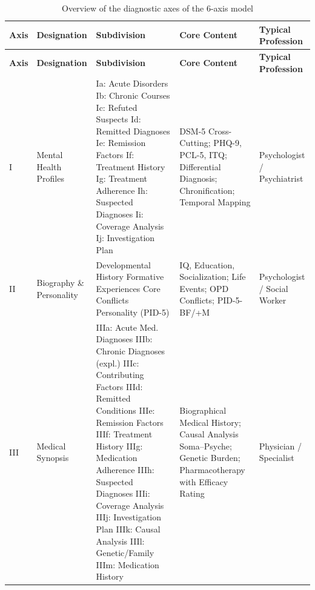 \documentclass[11pt,a4paper]{article}
\begin{document}
\begin{longtable}{p{0.8cm}p{2.2cm}p{3.8cm}p{4cm}p{2cm}}
\caption{Overview of the diagnostic axes of the 6-axis model} \label{tab:achsen} \\
\toprule
\textbf{Axis} & \textbf{Designation} & \textbf{Subdivision} & \textbf{Core Content} & \textbf{Typical Profession} \\
\midrule
\endfirsthead
\toprule
\textbf{Axis} & \textbf{Designation} & \textbf{Subdivision} & \textbf{Core Content} & \textbf{Typical Profession} \\
\midrule
\endhead
I & Mental Health Profiles & Ia: Acute Disorders \newline Ib: Chronic Courses \newline Ic: Refuted Suspects \newline Id: Remitted Diagnoses \newline Ie: Remission Factors \newline If: Treatment History \newline Ig: Treatment Adherence \newline Ih: Suspected Diagnoses \newline Ii: Coverage Analysis \newline Ij: Investigation Plan & DSM-5 Cross-Cutting; PHQ-9, PCL-5, ITQ; Differential Diagnosis; Chronification; Temporal Mapping & Psychologist / Psychiatrist \\
\addlinespace
II & Biography \& Personality & Developmental History \newline Formative Experiences \newline Core Conflicts \newline Personality (PID-5) & IQ, Education, Socialization; Life Events; OPD Conflicts; PID-5-BF/+M & Psychologist / Social Worker \\
\addlinespace
III & Medical Synopsis & IIIa: Acute Med. Diagnoses \newline IIIb: Chronic Diagnoses (expl.) \newline IIIc: Contributing Factors \newline IIId: Remitted Conditions \newline IIIe: Remission Factors \newline IIIf: Treatment History \newline IIIg: Medication Adherence \newline IIIh: Suspected Diagnoses \newline IIIi: Coverage Analysis \newline IIIj: Investigation Plan \newline IIIk: Causal Analysis \newline IIIl: Genetic/Family \newline IIIm: Medication History & Biographical Medical History; Causal Analysis Soma--Psyche; Genetic Burden; Pharmacotherapy with Efficacy Rating & Physician / Specialist \\

\end{longtable}
\end{document}
